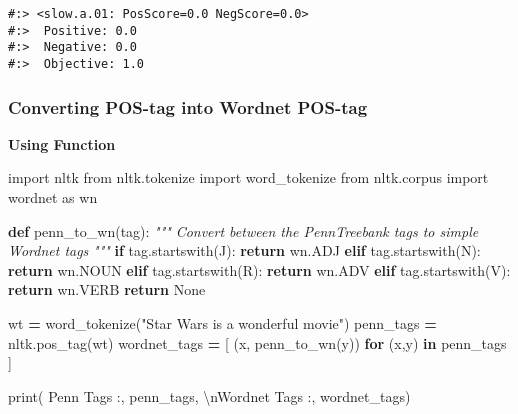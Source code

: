 \documentclass[
]{book}
\newenvironment{Shaded}{\begin{snugshade}}{\end{snugshade}}
\newcommand{\BuiltInTok}[1]{#1}
\newcommand{\CharTok}[1]{\textcolor[rgb]{0.5,0.5,0.5}{#1}}
\newcommand{\CommentTok}[1]{\textcolor[rgb]{0.37,0.37,0.37}{\textit{#1}}}
\newcommand{\ControlFlowTok}[1]{\textcolor[rgb]{0.27,0.27,0.27}{\textbf{#1}}}
\newcommand{\ImportTok}[1]{#1}
\newcommand{\KeywordTok}[1]{\textcolor[rgb]{0.27,0.27,0.27}{\textbf{#1}}}
\newcommand{\NormalTok}[1]{#1}
\newcommand{\OperatorTok}[1]{\textcolor[rgb]{0.43,0.43,0.43}{\textbf{#1}}}
\newcommand{\StringTok}[1]{\textcolor[rgb]{0.5,0.5,0.5}{#1}}
\newcommand{\VariableTok}[1]{\textcolor[rgb]{0,0,0}{#1}}
\begin{document}
\begin{verbatim}
#:> <slow.a.01: PosScore=0.0 NegScore=0.0> 
#:>  Positive: 0.0 
#:>  Negative: 0.0 
#:>  Objective: 1.0
\end{verbatim}

\hypertarget{converting-pos-tag-into-wordnet-pos-tag}{%
\subsubsection{Converting POS-tag into Wordnet POS-tag}\label{converting-pos-tag-into-wordnet-pos-tag}}

\textbf{Using Function}

\begin{Shaded}
\begin{Highlighting}[]
\ImportTok{import}\NormalTok{ nltk}
\ImportTok{from}\NormalTok{ nltk.tokenize }\ImportTok{import}\NormalTok{ word\_tokenize}
\ImportTok{from}\NormalTok{ nltk.corpus }\ImportTok{import}\NormalTok{ wordnet }\ImportTok{as}\NormalTok{ wn}

\KeywordTok{def}\NormalTok{ penn\_to\_wn(tag):}
    \CommentTok{"""}
\CommentTok{    Convert between the PennTreebank tags to simple Wordnet tags}
\CommentTok{    """}
    \ControlFlowTok{if}\NormalTok{ tag.startswith(}\StringTok{\textquotesingle{}J\textquotesingle{}}\NormalTok{):}
        \ControlFlowTok{return}\NormalTok{ wn.ADJ}
    \ControlFlowTok{elif}\NormalTok{ tag.startswith(}\StringTok{\textquotesingle{}N\textquotesingle{}}\NormalTok{):}
        \ControlFlowTok{return}\NormalTok{ wn.NOUN}
    \ControlFlowTok{elif}\NormalTok{ tag.startswith(}\StringTok{\textquotesingle{}R\textquotesingle{}}\NormalTok{):}
        \ControlFlowTok{return}\NormalTok{ wn.ADV}
    \ControlFlowTok{elif}\NormalTok{ tag.startswith(}\StringTok{\textquotesingle{}V\textquotesingle{}}\NormalTok{):}
        \ControlFlowTok{return}\NormalTok{ wn.VERB}
    \ControlFlowTok{return} \VariableTok{None}

\NormalTok{wt }\OperatorTok{=}\NormalTok{ word\_tokenize(}\StringTok{"Star Wars is a wonderful movie"}\NormalTok{)}
\NormalTok{penn\_tags }\OperatorTok{=}\NormalTok{ nltk.pos\_tag(wt)}
\NormalTok{wordnet\_tags }\OperatorTok{=}\NormalTok{ [ (x, penn\_to\_wn(y)) }\ControlFlowTok{for}\NormalTok{ (x,y) }\KeywordTok{in}\NormalTok{ penn\_tags ]}

\BuiltInTok{print}\NormalTok{(}
\StringTok{\textquotesingle{}Penn Tags    :\textquotesingle{}}\NormalTok{, penn\_tags, }
\StringTok{\textquotesingle{}}\CharTok{\textbackslash{}n}\StringTok{Wordnet Tags :\textquotesingle{}}\NormalTok{, wordnet\_tags)}
\end{Highlighting}
\end{Shaded}
\end{document}
